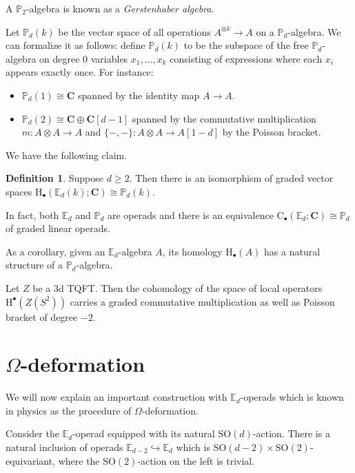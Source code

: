 \documentclass[10pt]{amsart}
\newcommand{\C}{\mathbf{C}}
\newcommand{\rC}{\mathrm{C}}
\newcommand{\bE}{\mathbb{E}}
\newcommand{\rH}{\mathrm{H}}
\newcommand{\bP}{\mathbb{P}}
\newcommand{\SO}{\mathrm{SO}}
\theoremstyle{definition}
\theoremstyle{definition}
\newtheorem{defn}[thm]{Definition}
\begin{document}
\begin{remark}
A $\bP_2$-algebra is known as a \emph{Gerstenhaber algebra}.
\end{remark}

Let $\bP_d(k)$ be the vector space of all operations $A^{\otimes k}\rightarrow A$ on a $\bP_d$-algebra. We can formalize it as follows: define $\bP_d(k)$ to be the subspace of the free $\bP_d$-algebra on degree 0 variables $x_1, \dots, x_k$ consisting of expressions where each $x_i$ appears exactly once. For instance:
\begin{itemize}
\item $\bP_d(1)\cong \C$ spanned by the identity map $A\rightarrow A$.
\item $\bP_d(2)\cong \C\oplus \C[d-1]$ spanned by the commutative multiplication $m\colon A\otimes A\rightarrow A$ and $\{-, -\}\colon A\otimes A\rightarrow A[1-d]$ by the Poisson bracket.
\end{itemize}

We have the following claim.

\begin{defn}
Suppose $d\geq 2$. Then there is an isomorphism of graded vector spaces $\rH_\bullet(\bE_d(k); \C)\cong \bP_d(k)$.
\end{defn}

\begin{remark}
In fact, both $\bE_d$ and $\bP_d$ are operads and there is an equivalence $\rC_\bullet(\bE_d; \C)\cong \bP_d$ of graded linear operads.
\end{remark}

As a corollary, given an $\bE_d$-algebra $A$, its homology $\rH_\bullet(A)$ has a natural structure of a $\bP_d$-algebra.

\begin{example}
Let $Z$ be a 3d TQFT. Then the cohomology of the space of local operators $\rH^\bullet(Z(S^2))$ carries a graded commutative multiplication as well as Poisson bracket of degree $-2$.
\end{example}

\section{$\Omega$-deformation}

We will now explain an important construction with $\bE_d$-operads which is known in physics as the procedure of $\Omega$-deformation.

Consider the $\bE_d$-operad equipped with its natural $\SO(d)$-action. There is a natural inclusion of operads $\bE_{d-2}\hookrightarrow \bE_d$ which is $\SO(d-2)\times \SO(2)$-equivariant, where the $\SO(2)$-action on the left is trivial.
\end{document}
